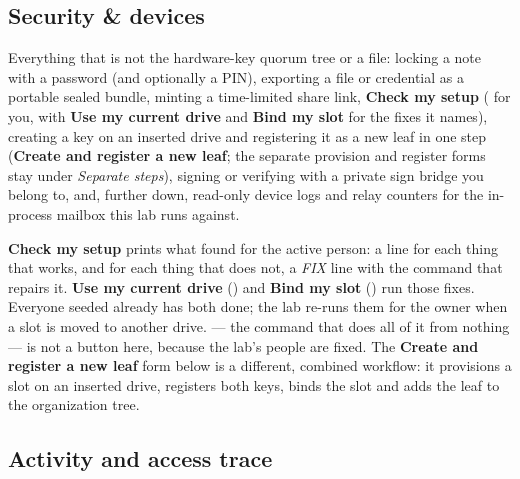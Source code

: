 \subsection{Security \& devices}

Everything that is not the hardware-key quorum tree or a file: locking a
note with a password (and optionally a PIN), exporting a file or credential
as a portable sealed bundle, minting a time-limited share link,
\textbf{Check my setup} ( for you, with
\textbf{Use my current drive} and \textbf{Bind my slot} for the fixes it
names), creating a key on an inserted drive and registering it as a new leaf in
one step (\textbf{Create and register a new leaf}; the separate provision and
register forms stay under \emph{Separate steps}), signing or verifying with a private sign bridge you belong to, and,
further down, read-only device logs and relay counters for the in-process
mailbox this lab runs against.


\textbf{Check my setup} prints what  found for the
active person: a line for each thing that works, and for each thing that does
not, a \emph{FIX} line with the command that repairs it. \textbf{Use my
current drive} () and \textbf{Bind my slot}
() run those fixes. Everyone seeded already has
both done; the lab re-runs them for the owner when a slot is moved to another
drive.  --- the command that does all of it from
nothing --- is not a button here, because the lab's people are fixed. The
\textbf{Create and register a new leaf} form below is a different, combined
workflow: it provisions a slot on an inserted drive, registers both keys,
binds the slot and adds the leaf to the organization tree.



\subsection{Activity and access trace}


